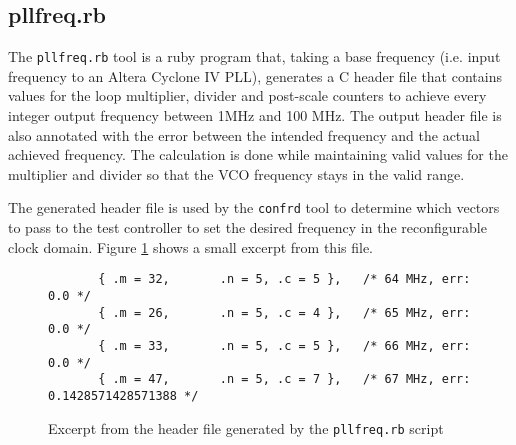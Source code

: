 \subsection{pllfreq.rb}
The \texttt{pllfreq.rb} tool is a ruby program that, taking a base frequency (i.e. input
frequency to an Altera Cyclone IV PLL), generates a C header file that contains values
for the loop multiplier, divider and post-scale counters to achieve every integer
output frequency between 1MHz and 100 MHz. The output header file is also annotated with the
error between the intended frequency and the actual achieved frequency. The calculation
is done while maintaining valid values for the multiplier and divider so that the VCO
frequency stays in the valid range.

The generated header file is used by the \texttt{confrd} tool to determine which vectors
to pass to the test controller to set the desired frequency in the reconfigurable
clock domain. Figure \ref{listing:pllfreq_h} shows a small excerpt from this file.

\begin{figure}[h!]
\lstset{basicstyle=\scriptsize\ttfamily}
\begin{lstlisting}
       { .m = 32,       .n = 5, .c = 5 },   /* 64 MHz, err: 0.0 */
       { .m = 26,       .n = 5, .c = 4 },   /* 65 MHz, err: 0.0 */
       { .m = 33,       .n = 5, .c = 5 },   /* 66 MHz, err: 0.0 */
       { .m = 47,       .n = 5, .c = 7 },   /* 67 MHz, err: 0.1428571428571388 */
\end{lstlisting}
\caption{Excerpt from the header file generated by the \texttt{pllfreq.rb} script}
\label{listing:pllfreq_h}
\end{figure}